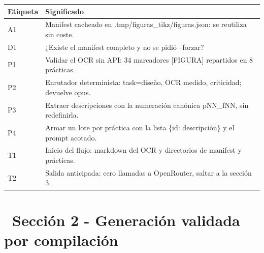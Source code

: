 \documentclass[11pt,a4paper]{article}
\newcommand{\iconotexto}[2]{\textcolor{cyanNeon}{\faIcon{#1}}~#2}
\begin{document}
\vspace{6pt}
\begin{tcolorbox}[cajaContenido, title={\faIcon{table}~Leyenda de etiquetas}]
\small
\begin{tabularx}{\linewidth}{@{}>{\centering\arraybackslash}p{1.4cm}X@{}}
\toprule
\textbf{Etiqueta} & \textbf{Significado} \\ \midrule
A1 & Manifest cacheado en .tmp/figuras\_tikz/figuras.json: se reutiliza sin coste. \\
D1 & ¿Existe el manifest completo y no se pidió --forzar? \\
P1 & Validar el OCR sin API: 34 marcadores [FIGURA] repartidos en 8 prácticas. \\
P2 & Enrutador determinista: task=diseño, OCR medido, criticidad; devuelve opus. \\
P3 & Extraer descripciones con la numeración canónica pNN\_fNN, sin redefinirla. \\
P4 & Armar un lote por práctica con la lista \{id: descripción\} y el prompt acotado. \\
T1 & Inicio del flujo: markdown del OCR y directorios de manifest y prácticas. \\
T2 & Salida anticipada: cero llamadas a OpenRouter, saltar a la sección 3. \\
\bottomrule
\end{tabularx}
\end{tcolorbox}

\section{\iconotexto{draw-polygon}{Sección 2 - Generación validada por compilación}}
\end{document}
